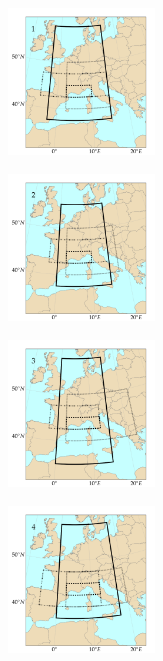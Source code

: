 \documentclass[twocol]{ametsoc}
\begin{document}
\begin{figure}[htb]
	\centering
	\begin{subfigure}{.5\columnwidth}
		\centering
		\includegraphics[width=3.9cm]{figures/spatial_win_z4/Spatial_windows_1.png}
	\end{subfigure}%
	\begin{subfigure}{.5\columnwidth}
		\centering
		\includegraphics[width=3.9cm]{figures/spatial_win_z4/Spatial_windows_2.png}
	\end{subfigure}
	\begin{subfigure}{.5\columnwidth}
		\centering
		\includegraphics[width=3.9cm]{figures/spatial_win_z4/Spatial_windows_3.png}
	\end{subfigure}%
	\begin{subfigure}{.5\columnwidth}
		\centering
		\includegraphics[width=3.9cm]{figures/spatial_win_z4/Spatial_windows_4.png}
	\end{subfigure}

\end{figure}
\end{document}
